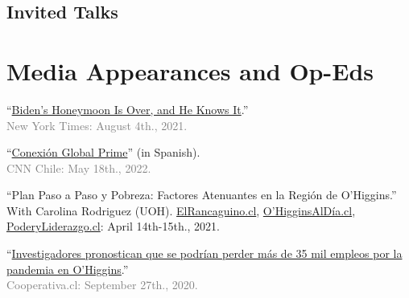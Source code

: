 \documentclass[letterpaper]{article}
\renewenvironment{itemize}{
  \begin{list}{}{
    \setlength{\leftmargin}{1.5em}
  }
}{
  \end{list}
}
\begin{document}
\subsection*{Invited Talks}

{\unskip}


\section*{Media Appearances and Op-Eds}

  \begin{itemize}

    \item[\textcolor{gray}{\textbullet}] ``\href{https://www.nytimes.com/2021/08/04/opinion/biden-eviction-covid-democrats.html}{Biden's Honeymoon Is Over, and He Knows It}.''\\\textcolor{gray}{New York Times: August 4th., 2021.}

    \item[\textcolor{gray}{\textbullet}] ``\href{https://twitter.com/CNNChile/status/1527122195780186112?s=20&t=-tO34V0-IHexWmRUePwHJ/}{Conexi\'on Global Prime}'' (in Spanish).\\\textcolor{gray}{CNN Chile: May 18th., 2022.}

    \item[\textcolor{gray}{\textbullet}] ``{\color{blue}Plan Paso a Paso y Pobreza: Factores Atenuantes en la Región de O'Higgins}.''\\With Carolina Rodriguez (UOH). \href{https://www.elrancaguino.cl/2021/04/14/opinion-plan-paso-a-paso-y-pobreza-factores-atenuantes-en-la-region-de-ohiggins/}{ElRancaguino.cl}, \href{https://ohigginsaldia.cl/2021/04/14/plan-paso-a-paso-y-pobreza-factores-atenuantes-en-la-region-de-ohiggins/amp/?__twitter_impression=true}{O'HigginsAlD\'ia.cl}, \href{https://www.poderyliderazgo.cl/opinion-plan-paso-a-paso-y-pobreza-factores-atenuantes-en-la-region-de-ohiggins/}{PoderyLiderazgo.cl}: {\color{gray} April 14th-15th., 2021.}

 
    \item[\textcolor{gray}{\textbullet}] ``\href{https://cooperativa.cl/noticias/pais/region-de-ohiggins/investigadores-pronostican-que-se-podrian-perder-mas-de-35-mil-empleos/2020-09-27/110705.html}{Investigadores pronostican que se podr\'ian perder m\'as de 35 mil empleos por la pandemia en O'Higgins}.''\\\textcolor{gray}{Cooperativa.cl: September 27th., 2020.}
   

\end{itemize}
\end{document}
